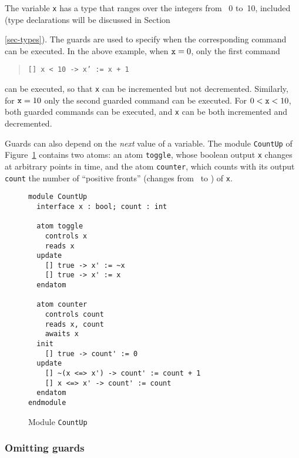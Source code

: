 The variable {\tt x} has a type that ranges over the integers from
~0 to~10, included (type declarations will be discussed in
Section{\ref{sec-types}).  The guards are used to specify when the
corresponding command can be executed.  In the above example, when
${\tt x} = 0$, only the first command 
%
\begin{quote}
{\tt [] x < 10 -> x' := x + 1}
\end{quote}
%
can be executed, so that {\tt x} can be incremented but not
decremented.  Similarly, for ${\tt x} = 10$ only the second guarded
command can be executed.  For $0 < {\tt x} < 10$, both guarded
commands can be executed, and {\tt x} can be both incremented and
decremented. 

Guards can also depend on the {\em next\/} value of a variable.  The
module {\tt CountUp} of Figure~\ref{fig-countup} contains two atoms:
an atom {\tt toggle}, whose boolean output {\tt x} changes at
arbitrary points in time, and the atom {\tt counter}, which counts
with its output {\tt count} the number of ``positive fronts'' (changes
from \FALSE\ to
\TRUE) of {\tt x}. 

\begin{figure}
\begin{verbatim}
module CountUp
  interface x : bool; count : int

  atom toggle 
    controls x
    reads x
  update 
    [] true -> x' := ~x 
    [] true -> x' := x 
  endatom

  atom counter
    controls count
    reads x, count
    awaits x
  init
    [] true -> count' := 0
  update
    [] ~(x <=> x') -> count' := count + 1
    [] x <=> x' -> count' := count
  endatom
endmodule 
\end{verbatim}
\caption{Module {\tt CountUp}}
\label{fig-countup}
\end{figure}

\subsubsection{Omitting guards}

\begin{table}
\end{table}}
